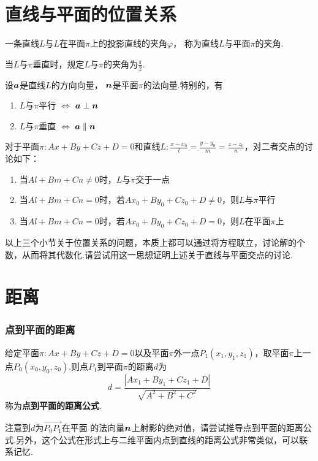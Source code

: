 \section{直线与平面的位置关系}
\begin{definition}[直线与平面的夹角]
  \par 一条直线$L$与$L$在平面$\pi$上的投影直线的夹角$\varphi$， 称为直线$L$与平面$\pi$的夹角.
  \par 当$L$与$\pi$垂直时，规定$L$与$\pi$的夹角为$\frac{\pi}{2}$.
\end{definition}
\par 设$\vb*{a}$是直线$L$的方向向量， $\vb*{n}$是平面$\pi$的法向量.特别的，有
\begin{enumerate}
  \item $L$与$\pi$平行 $\Leftrightarrow$ $\vb*{a} \perp \vb*{n}$
  \item $L$与$\pi$垂直 $\Leftrightarrow$ $\vb*{a} \parallel \vb*{n}$
\end{enumerate}
\par 对于平面$\pi:Ax+By+Cz+D=0$和直线$L:\frac{x-x_0}{l}=\frac{y-y_0}{m}=\frac{z-z_0}{n}$，对二者交点的讨论如下：
\begin{enumerate}
  \item 当$Al+Bm+Cn \not= 0$时，$L$与$\pi$交于一点
  \item 当$Al+Bm+Cn = 0$时，若$Ax_0+By_0+Cz_0+D \not= 0$，则$L$与$\pi$平行
  \item 当$Al+Bm+Cn = 0$时，若$Ax_0+By_0+Cz_0+D = 0$，则$L$在平面$\pi$上
\end{enumerate}
\begin{remark}
  以上三个小节关于位置关系的问题，本质上都可以通过将方程联立，讨论解的个数，从而将其代数化.请尝试用这一思想证明上述关于直线与平面交点的讨论.
\end{remark}

\section{距离}
\subsubsection*{点到平面的距离}
\par 给定平面$\pi:Ax+By+Cz+D=0$以及平面$\pi$外一点$P_1(x_1,y_1,z_1)$，取平面$\pi$上一点$P_0(x_0,y_0,z_0)$.则点$P_1$到平面$\pi$的距离$d$为
\begin{equation}
  d=\frac{|Ax_1+By_1+Cz_1+D|}{\sqrt{A^2+B^2+C^2}}
\end{equation}
称为\textbf{点到平面的距离公式}.
\begin{remark}
  注意到$d$为$\overrightarrow{P_0 P_1}$在平面 的法向量$\vb*{n}$上射影的绝对值，请尝试推导点到平面的距离公式.另外，这个公式在形式上与二维平面内点到直线的距离公式非常类似，可以联系记忆.
\end{remark}
